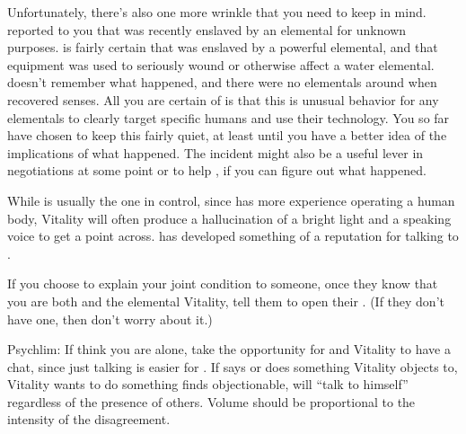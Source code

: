\documentclass[char]{elementals}
\begin{document}
Unfortunately, there's also one more wrinkle that you need to keep in mind.  \cGD{} reported to you that \cGD{\they} was recently enslaved by an elemental for unknown purposes.  \cGD{\They} is fairly certain that \cGD{\they} was enslaved by a powerful elemental, and that \cGD{\their} equipment was used to seriously wound or otherwise affect a water elemental.  \cGD{} doesn't remember what happened, and there were no elementals around when \cGD{\they} recovered \cGD{\their} senses.  All you are certain of is that this is unusual behavior for any elementals to clearly target specific humans and use their technology.  You so far have chosen to keep this fairly quiet, at least until you have a better idea of the implications of what happened.  The incident might also be a useful lever in negotiations at some point or to help \cGD{}, if you can figure out what happened.

While \cAvatar{} is usually the one in control, since \cAvatar{\they} has more experience operating a human body, Vitality will often produce a hallucination of a bright light and a speaking voice to get a point across.  \cAvatar{} has developed something of a reputation for talking to \cAvatar{\themself}.



If you choose to explain your joint condition to someone, once they know that you are both \cAvatar{} and the elemental Vitality, tell them to open their \mUnstickAvatar{}.  (If they don't have one, then don't worry about it.)

Psychlim:  If think you are alone, take the opportunity for \cAvatar{} and Vitality to have a chat, since just talking is easier for \cAvatar{}.  If \cAvatar{} says or does something Vitality objects to, Vitality wants \cAvatar{} to do something \cAvatar{\they} finds objectionable, \cAvatar{} will ``talk to himself'' regardless of the presence of others.  Volume should be proportional to the intensity of the disagreement.
\end{document}
